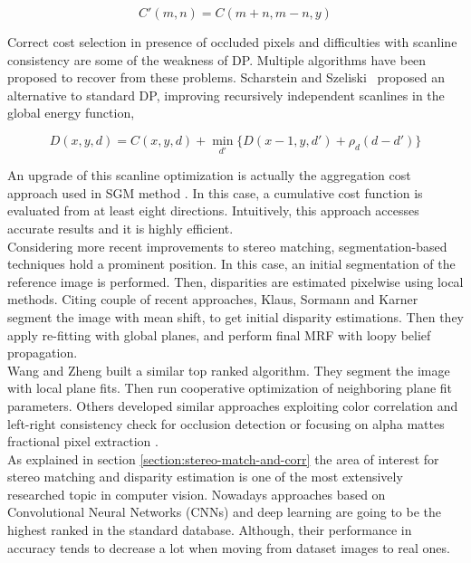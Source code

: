 \begin{equation}
\label{eqn:dynamicprog}
	C'(m,n) = C(m + n, m - n, y)
\end{equation}

Correct cost selection in presence of occluded pixels and difficulties with scanline consistency are some of the weakness of DP.
Multiple algorithms have been proposed to recover from these problems. 
Scharstein and Szeliski~\cite{Scharstein2001} proposed an alternative to standard DP, improving recursively independent scanlines in the global energy function,

\begin{equation}
\label{eqn:DPoptimization}
	D(x,y,d) = C(x,y,d) + \min_{d'}\{ D(x - 1, y, d') + \rho_{d} (d - d') \}
\end{equation}

An upgrade of this scanline optimization is actually the aggregation cost approach used in SGM method \cite{Hirschmuller2008}.
In this case, a cumulative cost function is evaluated from at least eight directions.
Intuitively, this approach accesses accurate results and it is highly efficient. \\
Considering more recent improvements to stereo matching, segmentation-based techniques hold a prominent position.
In this case, an initial segmentation of the reference image is performed.
Then, disparities are estimated pixelwise using local methods.
Citing couple of recent approaches, Klaus, Sormann and Karner \cite{Klaus2006} segment the image with mean shift, to get initial disparity estimations. 
Then they apply re-fitting with global planes, and perform final MRF with loopy belief propagation. \\
Wang and Zheng \cite{Wang2008} built a similar top ranked algorithm.
They segment the image with local plane fits. 
Then run cooperative optimization of neighboring plane fit parameters. 
Others developed similar approaches exploiting color correlation and left-right consistency check for occlusion detection \cite{yang2008stereo} or focusing on alpha mattes fractional pixel extraction \cite{bleyer2009stereo}.\\
As explained in section \ref{section:stereo-match-and-corr} the area of interest for stereo matching and disparity estimation is one of the most extensively researched topic in computer vision.
Nowadays approaches based on Convolutional Neural Networks (CNNs) and deep learning are going to be the highest ranked in the standard database.
Although, their performance in accuracy tends to decrease a lot when moving from dataset images to real ones.\\
